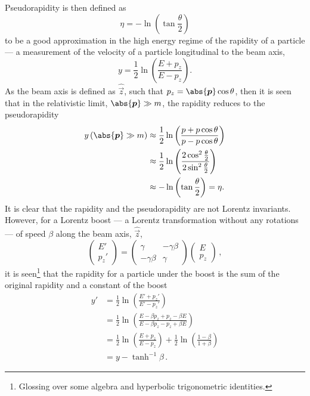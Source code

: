 \Gls{Pseudorapidity} is then defined as
\begin{equation}
 \eta = - \ln \left(\tan \frac{\theta}{2}\right)
 \label{eq:pseudorapidity}
\end{equation}
to be a good approximation in the high energy regime of the \gls{rapidity} of a particle --- a measurement of the velocity of a particle longitudinal to the beam axis,
\begin{equation}
 y = \frac{1}{2} \ln \left(\frac{E + p_{z}}{E - p_{z}}\right).
 \label{eq:rapidity}
\end{equation}
As the beam axis is defined as $\hat{\vec{z}}$, such that $p_{z} = \abs{\vec{p}} \cos\theta$, then it is seen that in the relativistic limit, $\abs{\vec{p}} \gg m$, the rapidity reduces to the pseudorapidity
\[
 \begin{split}
  y\left(\abs{\vec{p}} \gg m\right)   &\approx \frac{1}{2} \ln \left(\frac{p + p\cos\theta}{p - p\cos\theta}\right)\\
  &\approx \frac{1}{2} \ln \left(\frac{2 \cos^{2} \frac{\theta}{2}}{2 \sin^{2} \frac{\theta}{2}}\right) \\
  &\approx - \ln \left(\tan \frac{\theta}{2}\right) = \eta.
 \end{split}
\]
It is clear that the rapidity and the pseudorapidity are not \Glspl{Lorentz invariant}.
However, for a Lorentz \gls{boost} --- a Lorentz transformation without any rotations --- of speed $\beta$ along the beam axis, $\hat{\vec{z}}$,
\[
 \begin{pmatrix}
  E' \\
  p_{z}'
 \end{pmatrix}
 =
 \begin{pmatrix}%
  \gamma       & -\gamma\beta \\%
  -\gamma\beta & \gamma
 \end{pmatrix}%
 \begin{pmatrix}
  E \\
  p_{z}
 \end{pmatrix}\,,
\]
it is seen\footnote{Glossing over some algebra and hyperbolic trigonometric identities.} that the rapidity for a particle under the boost is the sum of the original rapidity and a constant of the boost
\[
 \begin{split}
  y'  &= \frac{1}{2} \ln \left(\frac{E' + p_{z}'}{E' - p_{z}'}\right) \\
  &= \frac{1}{2} \ln \left(\frac{E - \beta p_{z} + p_{z} - \beta E}{E - \beta p_{z} - p_{z} + \beta E}\right) \\
  &= \frac{1}{2} \ln \left(\frac{E + p_{z}}{E - p_{z}}\right) + \frac{1}{2} \ln \left(\frac{1 - \beta}{1 + \beta}\right) \\
  &= y - \tanh^{-1}\beta\,.
 \end{split}
\]
